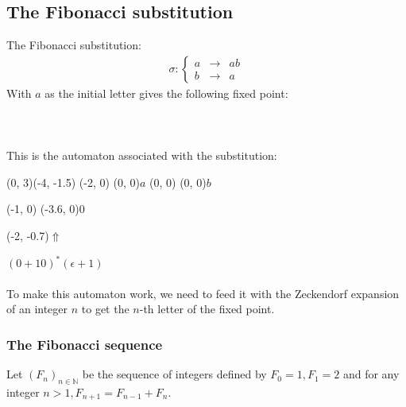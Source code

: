 \documentclass{article}
\begin{document}
\subsection{The Fibonacci substitution}
The Fibonacci substitution:
\begin{eqnarray*}
\sigma: \left\{ \begin{array}{lll}
a &\rightarrow& ab\\
b &\rightarrow& a
\end{array} \right.
\end{eqnarray*}
With $a$ as the initial letter gives the following fixed point:\\
\\
\\
\\
This is the automaton associated with the substitution:\\
\begin{graph}(0, 3)(-4, -1.5)
  (-2, 0) (0, 0){$a$}
  (0, 0)  (0, 0){$b$}

  (-1, 0) \freetext(-3.6, 0){0}
   
   

  \freetext(-2, -0.7){$\Uparrow$}
\end{graph} $(0 + 10)^* (\epsilon + 1)$\\
\\
To make this automaton work, we need to feed it with the Zeckendorf expansion
of an integer $n$ to get the $n$-th letter of the fixed point.

\subsubsection{The Fibonacci sequence}
Let $(F_n)_{n \in \mathbb{N}}$ be the sequence of integers defined by $F_0 = 1,
F_1 = 2$ and for any integer $n > 1, F_{n + 1} = F_{n - 1} + F_n$.
\end{document}
